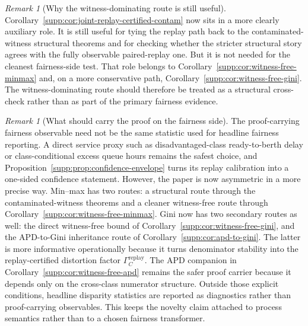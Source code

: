 \documentclass[11pt]{article}
\newcommand{\1}{\mathbf{1}}
\theoremstyle{definition}
\theoremstyle{plain}
\theoremstyle{remark}
\newtheorem{remark}[definition]{Remark}
\begin{document}
\begin{remark}[Why the witness-dominating route is still useful]
\label{supp:rem:replay-cert-novelty}
Corollary~\ref{supp:cor:joint-replay-certified-contam} now sits in a more clearly auxiliary role. It is still useful for tying the replay path back to the contaminated-witness structural theorems and for checking whether the stricter structural story agrees with the fully observable paired-replay one. But it is not needed for the cleanest fairness-side test. That role belongs to Corollary~\ref{supp:cor:witness-free-minmax} and, on a more conservative path, Corollary~\ref{supp:cor:witness-free-gini}. The witness-dominating route should therefore be treated as a structural cross-check rather than as part of the primary fairness evidence.
\end{remark}

\begin{remark}[What should carry the proof on the fairness side]
\label{supp:rem:fairness-envelope}
The proof-carrying fairness observable need not be the same statistic used for headline fairness reporting. A direct service proxy such as disadvantaged-class ready-to-berth delay or class-conditional excess queue hours remains the safest choice, and Proposition~\ref{supp:prop:confidence-envelope} turns its replay calibration into a one-sided confidence statement. However, the paper is now asymmetric in a more precise way. Min--max has two routes: a structural route through the contaminated-witness theorems and a cleaner witness-free route through Corollary~\ref{supp:cor:witness-free-minmax}. Gini now has two secondary routes as well: the direct witness-free bound of Corollary~\ref{supp:cor:witness-free-gini}, and the APD-to-Gini inheritance route of Corollary~\ref{supp:cor:apd-to-gini}. The latter is more informative operationally because it turns denominator stability into the replay-certified distortion factor $\Gamma_C^{\mathrm{replay}}$. The APD companion in Corollary~\ref{supp:cor:witness-free-apd} remains the safer proof carrier because it depends only on the cross-class numerator structure. Outside those explicit conditions, headline disparity statistics are reported as diagnostics rather than proof-carrying observables. This keeps the novelty claim attached to process semantics rather than to a chosen fairness transformer.
\end{remark}
\end{document}
